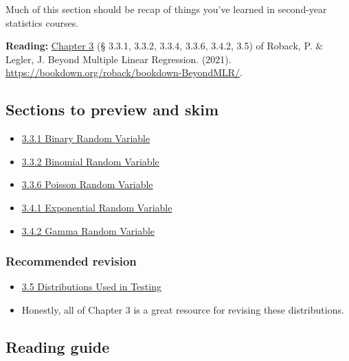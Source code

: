 \documentclass[
  openany]{book}
\providecommand{\tightlist}{%
  \setlength{\itemsep}{0pt}\setlength{\parskip}{0pt}}
\begin{document}
Much of this section should be recap of things you've learned in second-year statistics courses.

\textbf{Reading:} \href{https://bookdown.org/roback/bookdown-BeyondMLR/ch-distthry.html}{Chapter
3} (§
3.3.1, 3.3.2, 3.3.4, 3.3.6, 3.4.2, 3.5) of Roback, P. \& Legler, J.
Beyond Multiple Linear Regression. (2021).
\url{https://bookdown.org/roback/bookdown-BeyondMLR/}.

\hypertarget{sections-to-preview-and-skim}{%
\subsection{Sections to preview and skim}\label{sections-to-preview-and-skim}}

\begin{itemize}
\tightlist
\item
  \href{https://bookdown.org/roback/bookdown-BeyondMLR/ch-distthry.html\#sec-binary}{3.3.1 Binary Random
  Variable}
\item
  \href{https://bookdown.org/roback/bookdown-BeyondMLR/ch-distthry.html\#sec-binomial}{3.3.2 Binomial Random
  Variable}
\item
  \href{https://bookdown.org/roback/bookdown-BeyondMLR/ch-distthry.html\#poisson-random-variable}{3.3.6 Poisson Random
  Variable}
\item
  \href{https://bookdown.org/roback/bookdown-BeyondMLR/ch-distthry.html\#exponential-random-variable}{3.4.1 Exponential Random
  Variable}
\item
  \href{https://bookdown.org/roback/bookdown-BeyondMLR/ch-distthry.html\#gamma-random-variable}{3.4.2 Gamma Random
  Variable}
\end{itemize}

\hypertarget{recommended-revision}{%
\subsubsection{Recommended revision}\label{recommended-revision}}

\begin{itemize}
\tightlist
\item
  \href{https://bookdown.org/roback/bookdown-BeyondMLR/ch-distthry.html\#distributions-used-in-testing}{3.5 Distributions Used in
  Testing}
\item
  Honestly, all of Chapter 3 is a great resource for revising these
  distributions.
\end{itemize}

\hypertarget{reading-guide}{%
\subsection{Reading guide}\label{reading-guide}}
\end{document}
